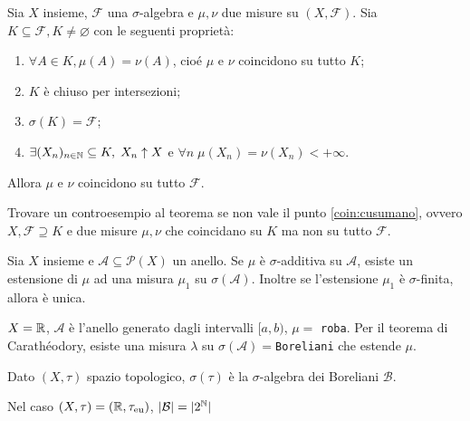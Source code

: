 \begin{thm}
	Sia $X$ insieme, $\mathcal{F}$ una $\sigma$-algebra e $\mu, \nu$ due misure su $(X,\mathcal{F})$. Sia $K\subseteq \mathcal{F}, K\neq \varnothing$ con le seguenti proprietà:
	\begin{enumerate}[label=(\roman*)]
	\item $\forall A \in K, \mu(A)=\nu(A)$, cioé $\mu$ e $\nu$ coincidono su tutto $K$;
	\item $K$ è chiuso per intersezioni;
	\item $\sigma(K)=\mathcal{F}$;
	\item\label{coin:cusumano} $\exists (X_n)_{n\in \mathbb{N}}\subseteq K, \; X_n \uparrow X$ e $\forall n\; \mu(X_n)=\nu(X_n)<+\infty$.
	\end{enumerate}
Allora $\mu$ e $\nu$ coincidono su tutto $\mathcal{F}$.
\end{thm}
\begin{exercise}
	Trovare un controesempio al teorema se non vale il punto \ref{coin:cusumano}, ovvero $X, \mathcal{F} \supseteq K$ e due misure $\mu,\nu$ che coincidano su $K$ ma non su tutto $\mathcal{F}$.
\end{exercise}
\begin{thm}
	Sia $X$ insieme e $\mathcal{A}\subseteq \mathcal{P}(X)$ un anello. Se $\mu$ è $\sigma$-additiva su $\mathcal{A}$, esiste un estensione di $\mu$ ad una misura $\mu_1$ su $\sigma(\mathcal{A})$. Inoltre se l'estensione $\mu_1$ è $\sigma$-finita, allora è unica.
\end{thm}

\begin{example}
	$X=\mathbb{R}$, $\mathcal{A}$ è l'anello generato dagli intervalli $[a,b)$, $\mu=$ \texttt{roba}.
	Per il teorema di Carathéodory, esiste una misura $\lambda$ su $\sigma(\mathcal{A})=$\texttt{Boreliani} che estende $\mu$.
\end{example}

\begin{definition}
	Dato $(X,\tau)$ spazio topologico, $\sigma(\tau)$ è la $\sigma$-algebra dei Boreliani $\mathcal{B}$.
\end{definition}
Nel caso $(X,\tau)=(\mathbb{R},\tau_{\text{eu}})$, $| \mathcal{B} | = | 2^{\mathbb{N}} |$
 
